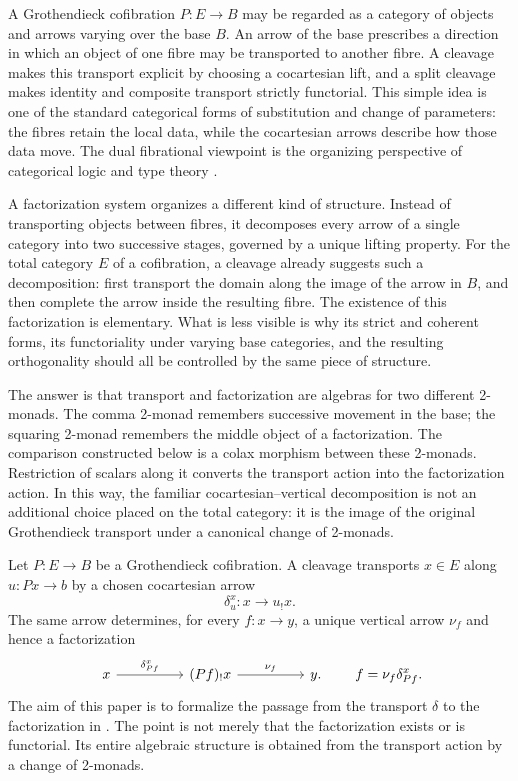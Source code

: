 \documentclass[11pt]{article}
\theoremstyle{plain}
\theoremstyle{definition}
\theoremstyle{remark}
\numberwithin{equation}{section}
\begin{document}
A Grothendieck cofibration $P\colon E\to B$ may be regarded as a
category of objects and arrows varying over the base $B$.  An arrow of
the base prescribes a direction in which an object of one fibre may be
transported to another fibre.  A cleavage makes this transport
explicit by choosing a cocartesian lift, and a split cleavage makes
identity and composite transport strictly functorial.  This simple
idea is one of the standard categorical forms of substitution and
change of parameters: the fibres retain the local data, while the
cocartesian arrows describe how those data move.
The dual fibrational viewpoint is the organizing perspective of
categorical logic and type theory \citep[Chapter~1]{Jacobs1999}.

A factorization system organizes a different kind of structure.
Instead of transporting objects between fibres, it decomposes every
arrow of a single category into two successive stages, governed by a
unique lifting property.  For the total category $E$ of a
cofibration, a cleavage already suggests such a decomposition: first
transport the domain along the image of the arrow in $B$, and then
complete the arrow inside the resulting fibre.  The existence of this
factorization is elementary.  What is less visible is why its strict
and coherent forms, its functoriality under varying base categories,
and the resulting orthogonality should all be controlled by the same
piece of structure.

The answer is that transport and factorization are algebras for two
different 2-monads.  The comma 2-monad remembers successive movement
in the base; the squaring 2-monad remembers the middle object of a
factorization.  The comparison constructed below is a colax morphism
between these 2-monads.  Restriction of scalars along it converts the
transport action into the factorization action.  In this way, the
familiar cocartesian--vertical decomposition is not an additional
choice placed on the total category: it is the image of the original
Grothendieck transport under a canonical change of 2-monads.

Let $P\colon E\to B$ be a Grothendieck cofibration.  A cleavage
transports $x\in E$ along $u\colon Px\to b$ by a chosen cocartesian
arrow
\begin{equation*}
  \delta^x_u\colon x\longrightarrow u_!x.
\end{equation*}
The same arrow determines, for every $f\colon x\to y$, a unique
vertical arrow $\nu_f$ and hence a factorization
\begin{equation}
\begin{tikzcd}[column sep=huge]
x \arrow[r,"\delta^{x}_{Pf}"]
  & (Pf)_{!}x \arrow[r,"\nu_f"]
  & y .
\end{tikzcd}
\qquad f=\nu_f\delta^{x}_{Pf}.
\label{eq:intro-factorization}
\end{equation}
The aim of this paper is to formalize the passage from the transport
$\delta$ to the factorization in .  The
point is not merely that the factorization exists or is functorial.  Its
entire algebraic structure is obtained from the transport action by a
change of 2-monads.
\end{document}
